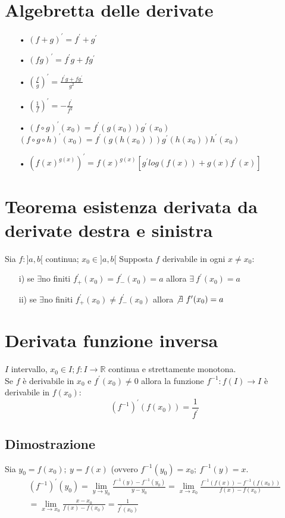 \section{Algebretta delle derivate}
\begin{enumerate}
\item[•] $(f+g)^{\prime} = f^{\prime} + g^{\prime}$
\item[•] $(fg)^{\prime} = f^{\prime}g + fg^{\prime}$
\item[•] $(\frac{f}{g})^{\prime} = \frac{f^{\prime}g + fg^{\prime}}{g^2}$
\item[•] $(\frac{1}{f})^{\prime} = -\frac{f^{\prime}}{f^2}$
\item[•] $(f \circ g)^{\prime}(x_0) = f^{\prime}(g(x_0))g^{\prime}(x_0)$\\
$(f \circ g \circ h)^{\prime}(x_0) = f^{\prime}(g(h(x_0)))g^{\prime}(h(x_0))h^{\prime}(x_0)$
\item[•] $(f(x)^{g(x)})^{\prime} = f(x)^{g(x)}[g^{\prime}log(f(x)) + g(x)f^{\prime}(x)]$
\end{enumerate}

\section{Teorema esistenza derivata da derivate destra e sinistra}
Sia $f: ]a,b[$ continua; $x_0 \in ]a,b[$ Supposta $f$ derivabile in ogni $x \neq x_0$:
\begin{enumerate}
\item[i)] se $\exists$no finiti $f^{\prime}_+(x_0) = f^{\prime}_-(x_0) = a$ allora $\exists\ f^{\prime}(x_0) = a$
\item[ii)] se $\exists$no finiti $f^{\prime}_+(x_0) \neq f^{\prime}_-(x_0)$ allora $\not\exists\ f^{\prime}(x_0) = a$
\end{enumerate}

\section{Derivata funzione inversa}
$I$ intervallo, $x_0 \in I; f:I \to \mathbb{R}$ continua e strettamente monotona.\\
Se $f$ è derivabile in $x_0$ e $f^{\prime}(x_0) \neq 0$ allora la funzione $f^{-1}: f(I) \to I$ è derivabile in $f(x_0)$:
\begin{equation}
(f^{-1})^{\prime}(f(x_0)) = \frac{1}{f^{\prime}}
\end{equation}
\subsection{Dimostrazione}
Sia $y_0 = f(x_0);\ y = f(x)$ (ovvero $f^{-1}(y_0) = x_0;\ f^{-1}(y) = x$.
\begin{equation} \displaystyle \begin{split}
(f^{-1})^{\prime}(y_0) = \lim_{y \to y_0}\frac{f^{-1}(y) - f^{-1}(y_0)}{y - y_0} = \lim_{x \to x_0}\frac{f^{-1}(f(x)) - f^{-1}(f(x_0))}{f(x) - f(x_0)}\\
 = \lim_{x \to x_0}\frac{x - x_0}{f(x) - f(x_0)} = \frac{1}{f^{\prime}(x_0)}
\end{split} \end{equation}

